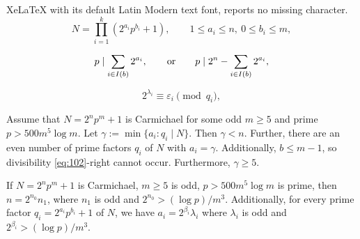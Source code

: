 \documentclass[10pt,a4paper]{amsart}
\begin{document}
XeLaTeX with its default Latin Modern text font, reports no missing character.
\begin{equation}
\label{eq:0}
N=\prod_{i=1}^k (2^{a_i}p^{b_i}+1),\qquad 1\le a_i\le n,~0\le b_i\le m,
\end{equation}

\begin{equation}
\label{eq:102}
p\mid \sum_{i\in I(b)} 2^{a_i},\qquad {\text{\rm or}}\qquad p\mid 2^n-\sum_{i\in I(b)} 2^{a_i},
\end{equation}

\begin{equation}
\label{eq:lambda}
2^{\lambda_{i}}\equiv \varepsilon_{i}\pmod {q_i},
\end{equation}

\begin{lemma}
\label{lem:2}
Assume that $N=2^np^m+1$ is Carmichael for some odd $m\ge 5$ and prime $p>500m^5\log m$. Let $\gamma:=\min\{a_i: q_i\mid N\}$. 
Then $\gamma<n$. Further, there are an even number of prime factors $q_i$ of $N$ with $a_i=\gamma$. Additionally, $b\le m-1$, so divisibility \eqref{eq:102}-right cannot occur. Furthermore,  $\gamma\ge 5$. 
\end{lemma}

\begin{lemma}
\label{lem:12}
If $N=2^np^m+1$ is Carmichael, $m\ge 5$ is odd, $p>500m^5\log m$ is prime, then $n=2^{n_0}n_1$, where $n_1$ is odd and $2^{n_0}>(\log p)/m^3$. Additionally,  for every prime factor $q_i=2^{a_i}p^{b_i}+1$ of $N$, we have $a_i=2^{\beta_i}\lambda_i$ where $\lambda_i$ is odd and 
$2^{\beta_i}>(\log p)/m^3$. 
\end{lemma}
\end{document}
